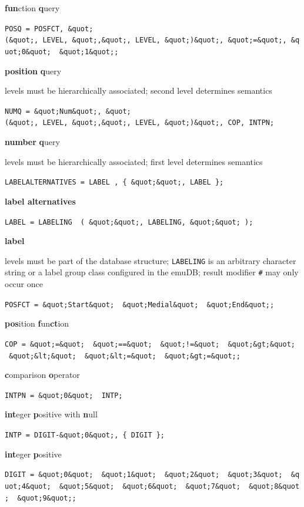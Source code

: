 \documentclass[]{book}
\theoremstyle{definition}
\theoremstyle{definition}
\theoremstyle{definition}
\theoremstyle{remark}
\begin{document}
\textbf{fun}ction \textbf{q}uery

\texttt{POSQ\ =\ POSFCT,\ \&quot;(\&quot;,\ LEVEL,\ \&quot;,\&quot;,\ LEVEL,\ \&quot;)\&quot;,\ \&quot;=\&quot;,\ \&quot;0\&quot;\ \textbar{}\ \&quot;1\&quot;;}

\textbf{position} \textbf{q}uery

levels must be hierarchically associated; second level determines
semantics

\texttt{NUMQ\ =\ \&quot;Num\&quot;,\ \&quot;(\&quot;,\ LEVEL,\ \&quot;,\&quot;,\ LEVEL,\ \&quot;)\&quot;,\ COP,\ INTPN;}

\textbf{number} \textbf{q}uery

levels must be hierarchically associated; first level determines
semantics

\texttt{LABELALTERNATIVES\ =\ LABEL\ ,\ \{\ \&quot;\textbar{}\&quot;,\ LABEL\ \};}

\textbf{label alternatives}

\texttt{LABEL\ =\ LABELING\ \textbar{}\ (\ \&quot;\textquotesingle{}\&quot;,\ LABELING,\ \&quot;\textquotesingle{}\&quot;\ );}

\textbf{label}

levels must be part of the database structure; \texttt{LABELING} is an
arbitrary character string or a label group class configured in the
emuDB; result modifier \texttt{\#} may only occur once

\texttt{POSFCT\ =\ \&quot;Start\&quot;\ \textbar{}\ \&quot;Medial\&quot;\ \textbar{}\ \&quot;End\&quot;;}

\textbf{pos}ition \textbf{f}un\textbf{ct}ion

\texttt{COP\ =\ \&quot;=\&quot;\ \textbar{}\ \&quot;==\&quot;\ \textbar{}\ \&quot;!=\&quot;\ \textbar{}\ \&quot;\&gt;\&quot;\ \textbar{}\ \&quot;\&lt;\&quot;\ \textbar{}\ \&quot;\&lt;=\&quot;\ \textbar{}\ \&quot;\&gt;=\&quot;;}

\textbf{c}omparison \textbf{o}perator

\texttt{INTPN\ =\ \&quot;0\&quot;\ \textbar{}\ INTP;}

\textbf{int}eger \textbf{p}ositive with \textbf{n}ull

\texttt{INTP\ =\ DIGIT-\&quot;0\&quot;,\ \{\ DIGIT\ \};}

\textbf{int}eger \textbf{p}ositive

\texttt{DIGIT\ =\ \&quot;0\&quot;\ \textbar{}\ \&quot;1\&quot;\ \textbar{}\ \&quot;2\&quot;\ \textbar{}\ \&quot;3\&quot;\ \textbar{}\ \&quot;4\&quot;\ \textbar{}\ \&quot;5\&quot;\ \textbar{}\ \&quot;6\&quot;\ \textbar{}\ \&quot;7\&quot;\ \textbar{}\ \&quot;8\&quot;\ \textbar{}\ \&quot;9\&quot;;}
\end{document}
